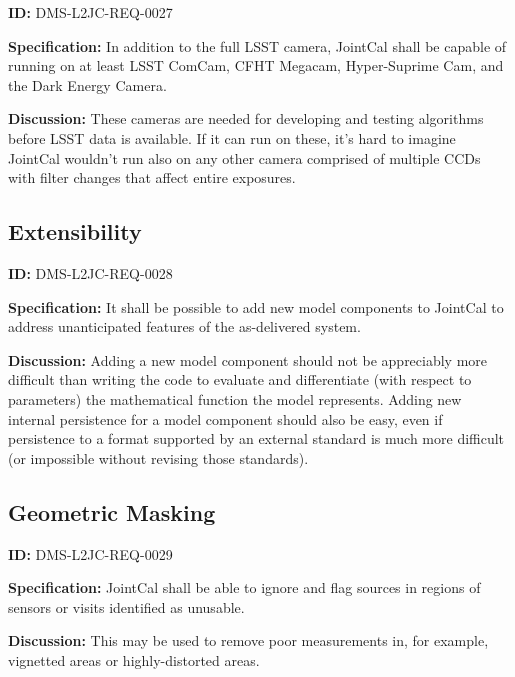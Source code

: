 \documentclass[SE,toc,lsstdraft]{lsstdoc}
\newcommand{\addendum}{}
\begin{document}
\label{DMS-L2JC-REQ-0027}
\textbf{ID:} DMS-L2JC-REQ-0027

\textbf{Specification:}
In addition to the full LSST camera, JointCal shall be capable of running on at least LSST ComCam, CFHT Megacam, Hyper-Suprime Cam, and the Dark Energy Camera.

\textbf{Discussion:}
These cameras are needed for developing and testing algorithms before LSST data is available.  If it can run on these, it's hard to imagine JointCal wouldn't run also on any other camera comprised of multiple CCDs with filter changes that affect entire exposures.

\subsection{Extensibility}

\label{DMS-L2JC-REQ-0028}
\textbf{ID:} DMS-L2JC-REQ-0028

\textbf{Specification:}
It shall be possible to add new model components to JointCal to address unanticipated features of the as-delivered system.

\textbf{Discussion:}
Adding a new model component should not be appreciably more difficult than writing the code to evaluate and differentiate (with respect to parameters) the mathematical function the model represents.  Adding new internal persistence for a model component should also be easy, even if persistence to a format supported by an external standard is much more difficult (or impossible without revising those standards).

\subsection{Geometric Masking}

\label{DMS-L2JC-REQ-0029}
\textbf{ID:} DMS-L2JC-REQ-0029

\textbf{Specification:}
JointCal shall be able to ignore and flag sources in regions of sensors or visits identified as unusable.

\textbf{Discussion:}
This may be used to remove poor measurements in, for example, vignetted areas or highly-distorted areas.

\addendum


\end{document}
